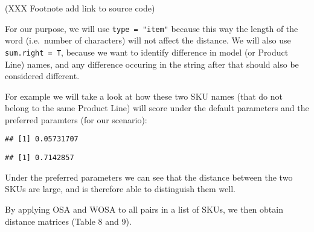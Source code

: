 \documentclass[]{article}
\newenvironment{Shaded}{\begin{snugshade}}{\end{snugshade}}
\newcommand{\KeywordTok}[1]{\textcolor[rgb]{0.13,0.29,0.53}{\textbf{{#1}}}}
\newcommand{\DataTypeTok}[1]{\textcolor[rgb]{0.13,0.29,0.53}{{#1}}}
\newcommand{\StringTok}[1]{\textcolor[rgb]{0.31,0.60,0.02}{{#1}}}
\newcommand{\NormalTok}[1]{{#1}}
\begin{document}
(XXX Footnote add link to source code)

For our purpose, we will use \texttt{type\ =\ "item"} because this way
the length of the word (i.e.~number of characters) will not affect the
distance. We will also use \texttt{sum.right\ =\ T}, because we want to
identify difference in model (or Product Line) names, and any difference
occuring in the string after that should also be considered different.

For example we will take a look at how these two SKU names (that do not
belong to the same Product Line) will score under the default parameters
and the preferred paramters (for our scenario):

\begin{Shaded}
\end{Shaded}

\begin{verbatim}
## [1] 0.05731707
\end{verbatim}

\begin{Shaded}
\end{Shaded}

\begin{verbatim}
## [1] 0.7142857
\end{verbatim}

Under the preferred parameters we can see that the distance between the
two SKUs are large, and is therefore able to distinguish them well.

By applying OSA and WOSA to all pairs in a list of SKUs, we then obtain
distance matrices (Table 8 and 9).
\end{document}
